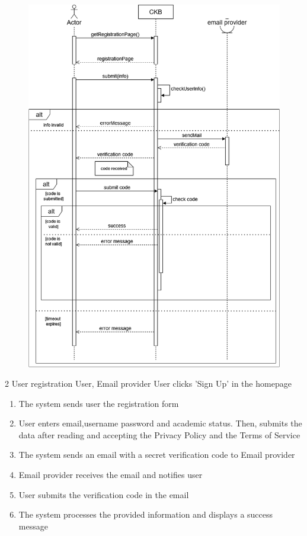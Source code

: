 \usecase
{
    \begin{figure}[H]
        \centering
        \includegraphics[width=\textwidth]{src/sd_diagrams/register.png}
    \end{figure}
}
{2}
{User registration} %
{User, Email provider} %
{User clicks 'Sign Up' in the homepage} %
{ %
    \begin{enumerate}
        \item The system sends user the registration form
        \item User enters email,username password and academic status. Then, submits the data after reading and accepting the Privacy Policy and the Terms of Service
        \item The system sends an email with a secret verification code to Email provider
        \item Email provider receives the email and notifies user
        \item User submits the verification code in the email
        \item The system processes the provided information and displays a success message
    \end{enumerate}
}
